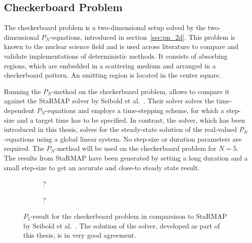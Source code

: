 \subsection{Checkerboard Problem}
\label{sec:pn_results_checkerboard}

The checkerboard problem is a two-dimensional setup solved by the two-dimensional $P_N$-equations, introduced in section~\ref{sec:pn_2d}. This problem is known to the nuclear science field and is used across literature to compare and validate implementations of deterministic methods. It consists of absorbing regions, which are embedded in a scattering medium and arranged in a checkerboard pattern. An emitting region is located in the center square.

Running the $P_N$-method on the checkerboard problem, allows to compare it against the \textsf{StaRMAP} solver by Seibold et al.~\cite{Seibold14}. Their solver solves the time-dependent $P_N$-equations and employs a time-stepping scheme, for which a step-size and a target time has to be specified. In contrast, the solver, which has been introduced in this thesis, solves for the steady-state solution of the real-valued $P_N$-equations using a global linear system. No step-size or duration parameters are required. The $P_N$-method will be used on the checkerboard problem for $N=5$. The results from \textsf{StaRMAP} have been generated by setting a long duration and a small step-size to get an accurate and close-to steady state result.
\begin{figure}[h]
\centering
\begin{subfigure}{0.49\columnwidth}
\caption{?}
\end{subfigure}%
\hspace{0.01\columnwidth}
\begin{subfigure}{0.49\columnwidth}
\caption{?}
\end{subfigure}%
\caption{$P_5$-result for the checkerboard problem in comparsison to \textsf{StaRMAP} by Seibold et al.~\cite{Seibold14}. The solution of the solver, developed as part of this thesis, is in very good agreement.}
\label{fig:pn_results_checkerboard1}
\end{figure}

